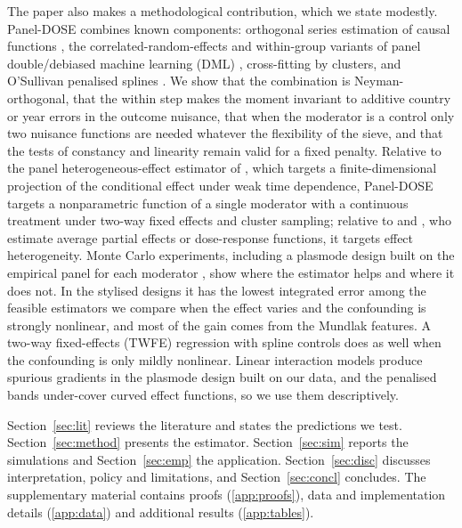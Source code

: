 \documentclass[preprint,12pt,authoryear]{elsarticle}
\begin{document}
The paper also makes a methodological contribution, which we state modestly. Panel-DOSE combines known components: orthogonal series estimation of causal functions \citep{semenova2021cate}, the correlated-random-effects and within-group variants of panel double/debiased machine learning (DML) \citep{clarke2023panel}, cross-fitting by clusters, and O'Sullivan penalised splines \citep{osullivan1986,wand2008osullivan}. We show that the combination is Neyman-orthogonal, that the within step makes the moment invariant to additive country or year errors in the outcome nuisance, that when the moderator is a control only two nuisance functions are needed whatever the flexibility of the sieve, and that the tests of constancy and linearity remain valid for a fixed penalty. Relative to the panel heterogeneous-effect estimator of \citet{semenova2023panel}, which targets a finite-dimensional projection of the conditional effect under weak time dependence, Panel-DOSE targets a nonparametric function of a single moderator with a continuous treatment under two-way fixed effects and cluster sampling; relative to \citet{klosin2022continuous} and \citet{colangelo2026continuous}, who estimate average partial effects or dose-response functions, it targets effect heterogeneity. Monte Carlo experiments, including a plasmode design built on the empirical panel for each moderator \citep{franklin2014plasmode}, show where the estimator helps and where it does not. In the stylised designs it has the lowest integrated error among the feasible estimators we compare when the effect varies and the confounding is strongly nonlinear, and most of the gain comes from the Mundlak features. A two-way fixed-effects (TWFE) regression with spline controls does as well when the confounding is only mildly nonlinear. Linear interaction models produce spurious gradients in the plasmode design built on our data, and the penalised bands under-cover curved effect functions, so we use them descriptively.

Section~\ref{sec:lit} reviews the literature and states the predictions we test. Section~\ref{sec:method} presents the estimator. Section~\ref{sec:sim} reports the simulations and Section~\ref{sec:emp} the application. Section~\ref{sec:disc} discusses interpretation, policy and limitations, and Section~\ref{sec:concl} concludes. The supplementary material contains proofs (\ref{app:proofs}), data and implementation details (\ref{app:data}) and additional results (\ref{app:tables}).

\end{document}
